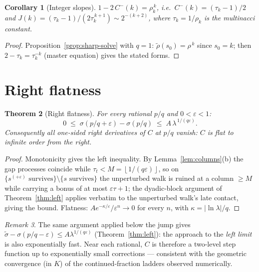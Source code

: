 \documentclass[11pt]{article}
\newtheorem{theorem}{Theorem}
\newtheorem{corollary}[theorem]{Corollary}
\theoremstyle{definition}
\theoremstyle{remark}
\newtheorem{remark}[theorem]{Remark}
\newcommand{\floor}[1]{\left\lfloor #1 \right\rfloor}
\begin{document}
\begin{corollary}[Integer slopes]\label{cor:integer}
$1 - 2\,C^-(k) = \rho_k^{\,k}$, i.e.\
$C^-(k) = (\tau_k - 1)/2$ and
$J(k) = (\tau_k - 1)/(2\tau_k^{\,k+1}) \sim 2^{-(k+2)}$,
where $\tau_k = 1/\rho_k$ is the multinacci constant.
\end{corollary}

\begin{proof}
Proposition~\ref{prop:sharp-solve} with $q = 1$:
$\tilde\rho(s_0) = \rho^{\,k}$ since $s_0 = k$; then
$2 - \tau_k = \tau_k^{-k}$ (master equation) gives the stated forms.
\end{proof}

\section{Right flatness}

\begin{theorem}[Right flatness]\label{thm:right}
For every rational $p/q$ and $0 < \varepsilon < 1$:
\[
0 \;\leq\; \sigma(p/q + \varepsilon) - \sigma(p/q)
\;\leq\; A\,\lambda^{\,1/(q\varepsilon)} .
\]
Consequently all one-sided right derivatives of $C$ at $p/q$ vanish:
$C$ is flat to infinite order from the right.
\end{theorem}

\begin{proof}
Monotonicity gives the left inequality.
By Lemma~\ref{lem:columns}(b) the gap processes coincide while
$\tau_t < M = \floor{1/(q\varepsilon)}$, so on
$\{s^{(+\varepsilon)} \text{ survives}\} \setminus
\{s \text{ survives}\}$ the unperturbed walk is ruined at a column
$\geq M$ while carrying a bonus of at most $\varepsilon\tau + 1$;
the dyadic-block argument of Theorem~\ref{thm:left} applies verbatim
to the unperturbed walk's late contact, giving the bound.
Flatness: $A e^{-\kappa/\varepsilon}/\varepsilon^n \to 0$ for every $n$,
with $\kappa = |{\ln \lambda}|/q$.
\end{proof}

\begin{remark}
The same argument applied below the jump gives
$\tilde\sigma - \sigma(p/q - \varepsilon) \leq A\lambda^{1/(q\varepsilon)}$
(Theorem~\ref{thm:left}): the approach to the \emph{left limit} is also
exponentially fast.
Near each rational, $C$ is therefore a two-level step function up to
exponentially small corrections --- consistent with the geometric
convergence (in $K$) of the continued-fraction ladders observed
numerically.
\end{remark}
\end{document}
